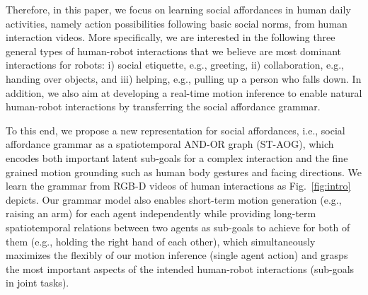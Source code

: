 \documentclass[letterpaper, 10 pt, conference]{ieeeconf}  %
\begin{document}
Therefore, in this paper, we focus on learning social affordances in human daily activities, namely action possibilities following basic social norms, from human interaction videos. More specifically, we are interested in the following three general types of human-robot interactions that we believe are most dominant interactions for robots: i) social etiquette, e.g., greeting, ii) collaboration, e.g., handing over objects, and iii) helping, e.g., pulling up a person who falls down. In addition, we also aim at developing a real-time motion inference to enable natural human-robot interactions by transferring the social affordance grammar. %

To this end, we propose a new representation for social affordances, i.e., social affordance grammar as a spatiotemporal AND-OR graph (ST-AOG), which encodes both important latent sub-goals for a complex interaction and the fine grained motion grounding such as human body gestures and facing directions. We learn the grammar from RGB-D videos of human interactions as Fig.~\ref{fig:intro} depicts. Our grammar model also enables short-term motion generation (e.g., raising an arm) for each agent independently while providing long-term spatiotemporal relations between two agents as sub-goals to achieve for both of them (e.g., holding the right hand of each other), which simultaneously maximizes the flexibly of our motion inference (single agent action) and grasps the most important aspects of the intended human-robot interactions (sub-goals in joint tasks).
\end{document}
